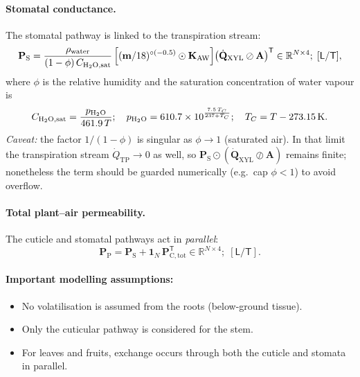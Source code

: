 \documentclass[12pt,a4paper]{article}
\newcommand{\R}{\mathbb{R}}
\newcommand{\oN}{\mathbf{1}_N}
\newcommand{\dL}{\mathsf{L}}
\newcommand{\dT}{\mathsf{T}}
\begin{document}
\paragraph{Stomatal conductance.}  The stomatal pathway is linked to the transpiration stream:
\begin{equation}\label{eq:Ps}
    \mathbf{P}_\mathrm{S} = \frac{\rho_\mathrm{water}}{(1-\phi)\,C_{\ce{H2O}\mathrm{,sat}}}\left[(\mathbf{m}/18)^{\circ(-0.5)}\odot\mathbf{K}_\mathrm{AW}\right]\!\left(\dot{\mathbf{Q}}_\mathrm{XYL}\oslash \mathbf{A}\right)^\mathsf{T}\in \R^{N\times 4};\; [\dL/\dT],
\end{equation}
where $\phi$ is the relative humidity and the saturation concentration of water vapour is
\begin{equation}\label{eq:Csat}
    C_{\ce{H2O}\mathrm{,sat}} = \frac{p_{\ce{H2O}}}{461.9\,T};\quad p_{\ce{H2O}} = 610.7\times 10^{\frac{7.5\,T_C}{237 + T_C}};\quad T_C = T - \SI{273.15}{K}.
\end{equation}
\emph{Caveat:} the factor $1/(1-\phi)$ is singular as $\phi\to1$ (saturated air).  In that limit the transpiration stream $\dot{Q}_\mathrm{TP}\to0$ as well, so $\mathbf{P}_\mathrm{S}\odot(\dot{\mathbf Q}_\mathrm{XYL}\oslash\mathbf A)$ remains finite; nonetheless the term should be guarded numerically (e.g.\ cap $\phi<1$) to avoid overflow.

\paragraph{Total plant--air permeability.}  The cuticle and stomatal pathways act in \emph{parallel}:
\begin{equation}\label{eq:Pp}
    \mathbf{P}_\mathrm{P} = \mathbf{P}_\mathrm{S} + \oN\,\mathbf{P}_\mathrm{C, tot}^\mathsf{T} \in \R^{N\times 4};\; [\dL/\dT].
\end{equation}

\paragraph{Important modelling assumptions:}
\begin{itemize}[nosep]
    \item No volatilisation is assumed from the roots (below-ground tissue).
    \item Only the cuticular pathway is considered for the stem.
    \item For leaves and fruits, exchange occurs through both the cuticle and stomata in parallel.
\end{itemize}
\end{document}
